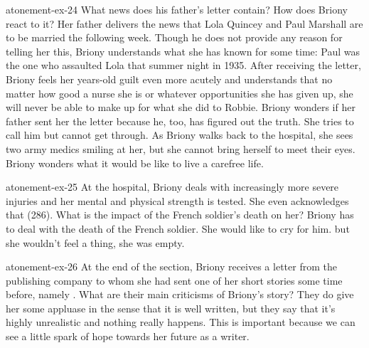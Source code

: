 \documentclass[preview]{standalone}
\begin{document}
\begin{snippetexercise}{atonement-ex-24}
    {What news does his father's letter contain? How does Briony react to it?}
    Her father delivers the news that Lola Quincey and Paul Marshall are to
    be married the following week.
    Though he does not provide any reason for telling her this,
    Briony understands what she has known for some time:
    Paul was the one who assaulted Lola that summer night in 1935.
    After receiving the letter, Briony feels her years-old guilt
    even more acutely and understands that no matter how good a nurse she is
    or whatever opportunities she has given up,
    she will never be able to make up for what she did to Robbie.
    Briony wonders if her father sent her the letter because he, too, has figured out the truth.
    She tries to call him but cannot get through.
    As Briony walks back to the hospital,
    she sees two army medics smiling at her, but she cannot bring herself to meet their eyes.
    Briony wonders what it would be like to live a carefree life.
\end{snippetexercise}

\begin{snippetexercise}{atonement-ex-25}
    {At the hospital, Briony deals with increasingly more severe injuries and her mental and physical
    strength is tested. She even acknowledges that  (286). What is the impact of the French soldier's death on her?}
    Briony has to deal with the death of the French soldier. She would like to cry for him.
    but she wouldn't feel a thing, she was empty.
\end{snippetexercise}

\begin{snippetexercise}{atonement-ex-26}
    {At the end of the section, Briony receives a letter from the publishing company to whom she had
    sent one of her short stories some time before, namely . What are their
    main criticisms of Briony's story?}
    They do give her some appluase in the sense that it is well written,
    but they say that it's highly unrealistic and nothing really happens.
    This is important because we can see a little spark of hope towards her future as a writer.
\end{snippetexercise}
\end{document}
